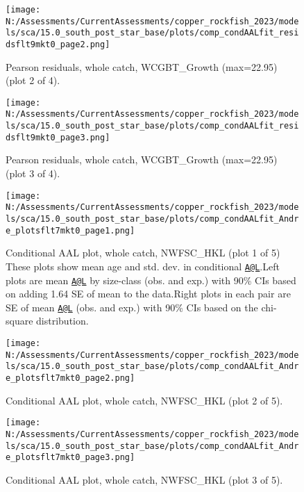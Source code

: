 \documentclass[11pt,
  english,
  letterpaper,
]{article}
\begin{document}
\begin{figure}
\centering
\texttt{[image: N:/Assessments/CurrentAssessments/copper\_rockfish\_2023/models/sca/15.0\_south\_post\_star\_base/plots/comp\_condAALfit\_residsflt9mkt0\_page2.png]}
\caption{Pearson residuals, whole catch, WCGBT\_Growth (max=22.95) (plot 2 of 4).\label{fig:comp_condAALfit_residsflt9mkt0_page2}}
\end{figure}

\begin{figure}
\centering
\texttt{[image: N:/Assessments/CurrentAssessments/copper\_rockfish\_2023/models/sca/15.0\_south\_post\_star\_base/plots/comp\_condAALfit\_residsflt9mkt0\_page3.png]}
\caption{Pearson residuals, whole catch, WCGBT\_Growth (max=22.95) (plot 3 of 4).\label{fig:comp_condAALfit_residsflt9mkt0_page3}}
\end{figure}

\begin{figure}
\centering
\texttt{[image: N:/Assessments/CurrentAssessments/copper\_rockfish\_2023/models/sca/15.0\_south\_post\_star\_base/plots/comp\_condAALfit\_Andre\_plotsflt7mkt0\_page1.png]}
\caption{Conditional AAL plot, whole catch, NWFSC\_HKL (plot 1 of 5) These plots show mean age and std. dev. in conditional \href{mailto:A@L}{\nolinkurl{A@L}}.Left plots are mean \href{mailto:A@L}{\nolinkurl{A@L}} by size-class (obs. and exp.) with 90\% CIs based on adding 1.64 SE of mean to the data.Right plots in each pair are SE of mean \href{mailto:A@L}{\nolinkurl{A@L}} (obs. and exp.) with 90\% CIs based on the chi-square distribution.\label{fig:comp_condAALfit_Andre_plotsflt7mkt0_page1}}
\end{figure}

\begin{figure}
\centering
\texttt{[image: N:/Assessments/CurrentAssessments/copper\_rockfish\_2023/models/sca/15.0\_south\_post\_star\_base/plots/comp\_condAALfit\_Andre\_plotsflt7mkt0\_page2.png]}
\caption{Conditional AAL plot, whole catch, NWFSC\_HKL (plot 2 of 5).\label{fig:comp_condAALfit_Andre_plotsflt7mkt0_page2}}
\end{figure}

\begin{figure}
\centering
\texttt{[image: N:/Assessments/CurrentAssessments/copper\_rockfish\_2023/models/sca/15.0\_south\_post\_star\_base/plots/comp\_condAALfit\_Andre\_plotsflt7mkt0\_page3.png]}
\caption{Conditional AAL plot, whole catch, NWFSC\_HKL (plot 3 of 5).\label{fig:comp_condAALfit_Andre_plotsflt7mkt0_page3}}
\end{figure}
\end{document}
